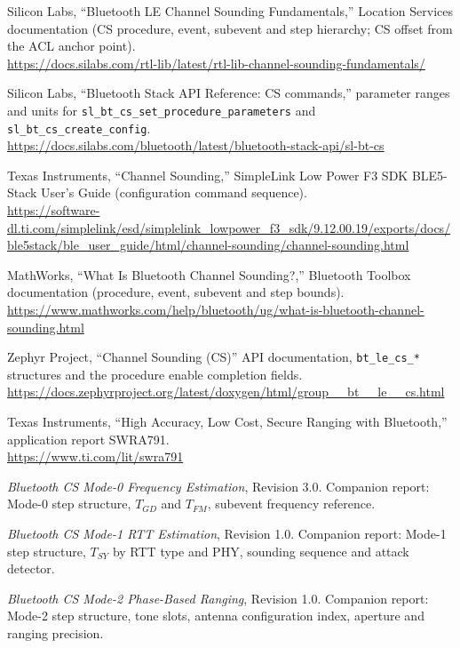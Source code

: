 \documentclass[11pt,a4paper]{article}
\newcommand{\code}[1]{\texttt{\small #1}}
\newcommand{\Tsy}{T_{SY}}
\newcommand{\Tgd}{T_{GD}}
\newcommand{\Tfm}{T_{FM}}
\begin{document}
\begin{enumerate}[label={[\arabic*]},leftmargin=2.2em,itemsep=3pt]
\item Silicon Labs, ``Bluetooth LE Channel Sounding Fundamentals,'' Location Services documentation
  (CS procedure, event, subevent and step hierarchy; CS offset from the ACL anchor point).\\
  {\small\url{https://docs.silabs.com/rtl-lib/latest/rtl-lib-channel-sounding-fundamentals/}}

\item Silicon Labs, ``Bluetooth Stack API Reference: CS commands,'' parameter ranges and units for
  \code{sl\_bt\_cs\_set\_procedure\_parameters} and \code{sl\_bt\_cs\_create\_config}.\\
  {\small\url{https://docs.silabs.com/bluetooth/latest/bluetooth-stack-api/sl-bt-cs}}

\item Texas Instruments, ``Channel Sounding,'' SimpleLink Low Power F3 SDK BLE5-Stack User's Guide
  (configuration command sequence).\\
  {\small\url{https://software-dl.ti.com/simplelink/esd/simplelink_lowpower_f3_sdk/9.12.00.19/exports/docs/ble5stack/ble_user_guide/html/channel-sounding/channel-sounding.html}}

\item MathWorks, ``What Is Bluetooth Channel Sounding?,'' Bluetooth Toolbox documentation
  (procedure, event, subevent and step bounds).\\
  {\small\url{https://www.mathworks.com/help/bluetooth/ug/what-is-bluetooth-channel-sounding.html}}

\item Zephyr Project, ``Channel Sounding (CS)'' API documentation, \code{bt\_le\_cs\_*} structures
  and the procedure enable completion fields.\\
  {\small\url{https://docs.zephyrproject.org/latest/doxygen/html/group__bt__le__cs.html}}

\item Texas Instruments, ``High Accuracy, Low Cost, Secure Ranging with Bluetooth,'' application
  report SWRA791.\\
  {\small\url{https://www.ti.com/lit/swra791}}

\item \emph{Bluetooth CS Mode-0 Frequency Estimation}, Revision 3.0. Companion report: Mode-0 step
  structure, $\Tgd$ and $\Tfm$, subevent frequency reference.

\item \emph{Bluetooth CS Mode-1 RTT Estimation}, Revision 1.0. Companion report: Mode-1 step
  structure, $\Tsy$ by RTT type and PHY, sounding sequence and attack detector.

\item \emph{Bluetooth CS Mode-2 Phase-Based Ranging}, Revision 1.0. Companion report: Mode-2 step
  structure, tone slots, antenna configuration index, aperture and ranging precision.
\end{enumerate}
\end{document}
